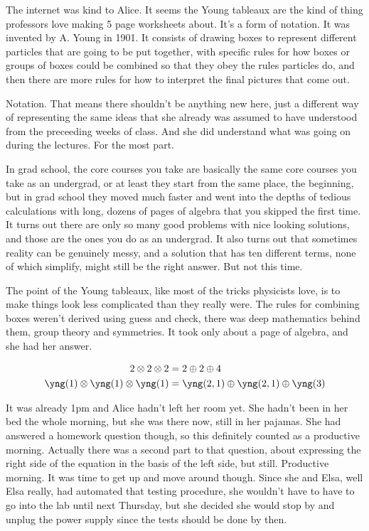 \mypause
 
The internet was kind to Alice. It seems the Young tableaux are the kind of thing professors love making 5 page worksheets about. It's a form of notation. It was invented by A. Young in 1901. It consists of drawing boxes to represent different particles that are going to be put together, with specific rules for how boxes or groups of boxes could be combined so that they obey the rules particles do, and then there are more rules for how to interpret the final pictures that come out. 

Notation. That means there shouldn't be anything new here, just a different way of representing the same ideas that she already was assumed to have understood from the preceeding weeks of class. And she did understand what was going on during the lectures. For the most part. 

In grad school, the core courses you take are basically the same core courses you take as an undergrad, or at least they start from the same place, the beginning, but in grad school they moved much faster and went into the depths of tedious calculations with long, dozens of pages of algebra that you skipped the first time. It turns out there are only so many good problems with nice looking solutions, and those are the ones you do as an undergrad. It also turns out that sometimes reality can be genuinely messy, and a solution that has ten different terms, none of which simplify, might still be the right answer. But not this time.

The point of the Young tableaux, like most of the tricks physicists love, is to make things look less complicated than they really were. The rules for combining boxes weren't derived using guess and check, there was deep mathematics behind them, group theory and symmetries. It took only about a page of algebra, and she had her answer.

{\begin{align*}
2\otimes 2\otimes 2 &= 2\oplus 2 \oplus 4 \\
\yng(1)\otimes\yng(1)\otimes\yng(1) &=
\yng(2,1)\oplus\yng(2,1)\oplus\yng(3)
\end{align*}}

\mymark

It was already 1pm and Alice hadn't left her room yet. She hadn't been in her bed the whole morning, but she was there now, still in her pajamas. She had answered a homework question though, so this definitely counted as a productive morning. Actually there was a second part to that question, about expressing the right side of the equation in the basis of the left side, but still. Productive morning. It was time to get up and move around though. Since she and Elsa, well Elsa really, had automated that testing procedure, she wouldn't have to have to go into the lab until next Thursday, but she decided she would stop by    and unplug the power supply since the tests should be done by then. 

